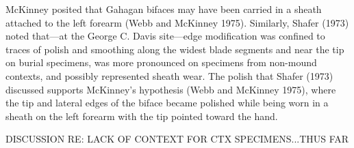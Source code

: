 \documentclass[review]{elsarticle}
\begin{document}
McKinney posited that Gahagan bifaces may have been carried in a sheath attached to the left forearm (Webb and McKinney 1975). Similarly, Shafer (1973) noted that---at the George C. Davis site---edge modification was confined to traces of polish and smoothing along the widest blade segments and near the tip on burial specimens, was more pronounced on specimens from non-mound contexts, and possibly represented sheath wear. The polish that Shafer (1973) discussed supports McKinney’s hypothesis (Webb and McKinney 1975), where the tip and lateral edges of the biface became polished while being worn in a sheath on the left forearm with the tip pointed toward the hand.

DISCUSSION RE: LACK OF CONTEXT FOR CTX SPECIMENS...THUS FAR


\end{document}
